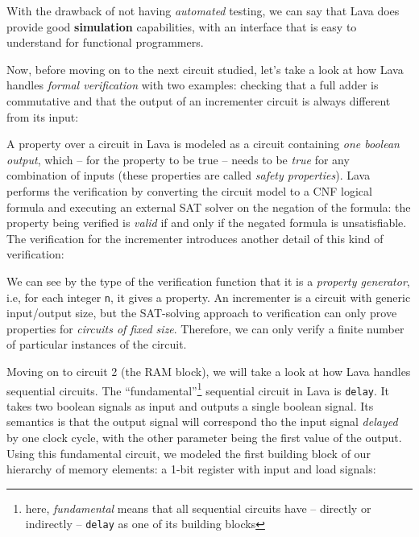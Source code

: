             With the drawback of not having \emph{automated} testing, we can say that Lava does
            provide good \textbf{simulation} capabilities, with an interface that is easy to
            understand for functional programmers.

            Now, before moving on to the next circuit studied, let's take a look at how Lava handles
            \emph{formal verification} with two examples: checking that a full adder is commutative
            and that the output of an incrementer circuit is always different from its input:


            A property over a circuit in Lava is modeled as a circuit containing \emph{one boolean
                output}, which -- for the property to be true -- needs to be \emph{true} for any
            combination of inputs (these properties are called \emph{safety properties}). Lava
            performs the verification by converting the circuit model to a CNF logical formula and
            executing an external SAT solver on the negation of the formula: the property being
            verified is \emph{valid} if and only if the negated formula is unsatisfiable. The
            verification for the incrementer introduces another detail of this kind of verification:


            We can see by the type of the verification function that it is a \emph{property
                generator}, i.e, for each integer \texttt{n}, it gives a property. An incrementer is
            a circuit with generic input/output size, but the SAT-solving approach to verification
            can only prove properties for \emph{circuits of fixed size}. Therefore, we can only
            verify a finite number of particular instances of the circuit.

            Moving on to circuit 2 (the RAM block), we will take a look at how Lava handles
            sequential circuits. The ``fundamental''\footnote{here, \emph{fundamental} means that
                all sequential circuits have -- directly or indirectly -- \texttt{delay} as one of
                its building blocks} sequential circuit in Lava is \texttt{delay}.  It takes two
            boolean signals as input and outputs a single boolean signal. Its semantics is that the
            output signal will correspond tho the input signal \emph{delayed} by one clock cycle,
            with the other parameter being the first value of the output.  Using this fundamental
            circuit, we modeled the first building block of our hierarchy of memory elements: a
            1-bit register with input and load signals:

